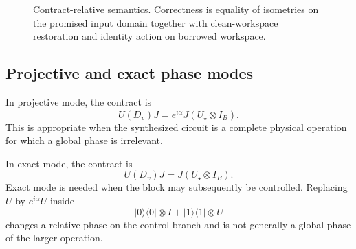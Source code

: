 \begin{figure}[t]
\centering
{}
\caption{Contract-relative semantics. Correctness is equality of isometries on the promised input domain together with clean-workspace restoration and identity action on borrowed workspace.}
\label{fig:ancilla-contract}
\end{figure}

\subsection{Projective and exact phase modes}

In projective mode, the contract is
\begin{equation}
\boxed{
U(D_v)J=e^{i\alpha}J(U_\star\otimes I_B).
}
\label{eq:projective-contract}
\end{equation}
This is appropriate when the synthesized circuit is a complete physical operation for which a global phase is irrelevant.

In exact mode, the contract is
\begin{equation}
\boxed{
U(D_v)J=J(U_\star\otimes I_B).
}
\label{eq:exact-contract}
\end{equation}
Exact mode is needed when the block may subsequently be controlled. Replacing $U$ by $e^{i\alpha}U$ inside
\begin{equation}
\lvert0\rangle\!\langle0\rvert\otimes I
+\lvert1\rangle\!\langle1\rvert\otimes U
\end{equation}
changes a relative phase on the control branch and is not generally a global phase of the larger operation.


